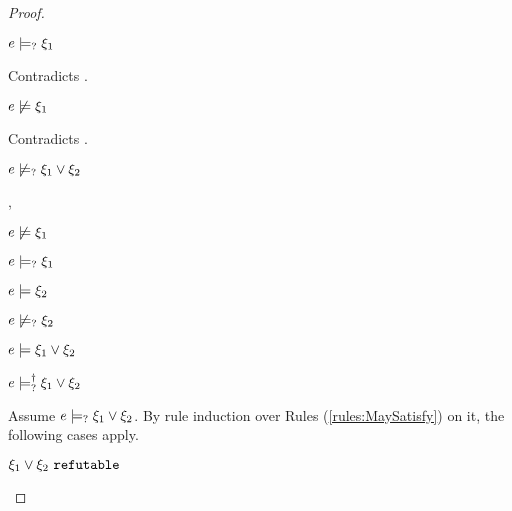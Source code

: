 \begin{proof}
\begin{byCases}
\begin{byCases}
\begin{byCases}
        \item[\text{(\ref{rule:CMSOr1})}]
            \begin{pfsteps*}
            \item $e \models_{?} \xi_1$ 
            \end{pfsteps*}
            Contradicts .
        \item[\text{(\ref{rule:CMSOr2})}]
            \begin{pfsteps*}
            \item $e \not\models \xi_1$ 
            \end{pfsteps*}
            Contradicts .
        \end{byCases}
        \begin{pfsteps*}
        \item $e \not\models_{?} \xi_1 \vee \xi_2$ 
        \end{pfsteps*}
    \item[\cmaysatisfy{e}{\xi_1},\csatisfy{e}{\xi_2}]
        \begin{pfsteps*}
        \item $e \not\models \xi_1$  
        \item $e \models_{?} \xi_1$  
        \item $e \models \xi_2$  
        \item $e \not\models_{?} \xi_2$  
        \item $e \models \xi_1 \vee \xi_2$  
        \item $e \models_{?}^{\dag} \xi_1 \vee \xi_2$ 
        \end{pfsteps*}
        Assume $e \models_{?} \xi_1 \vee \xi_2$. By rule induction over Rules (\ref{rules:MaySatisfy}) on it, the following cases apply.
        \begin{byCases}
        \item[\text{(\ref{rule:CMSNotVal})}]
            \begin{pfsteps*}
            \item $\xi_1 \vee \xi_2 ~\mathtt{refutable}$ 

\end{pfsteps*}
\end{byCases}
\end{byCases}
\end{byCases}
\end{proof}
